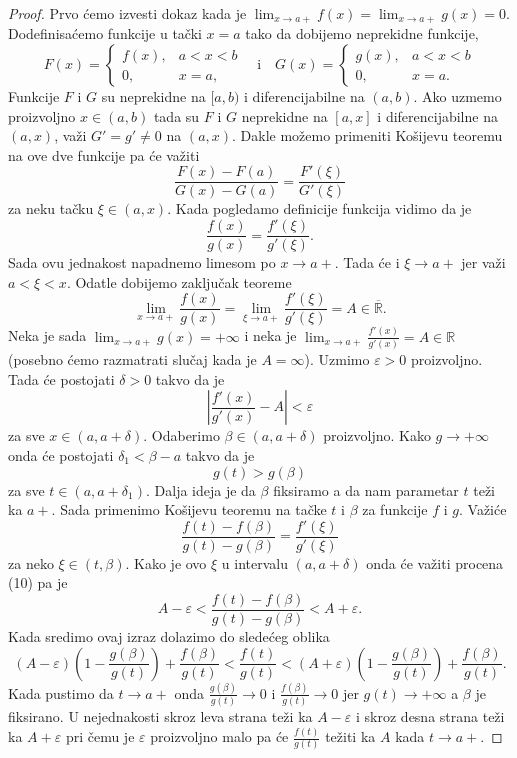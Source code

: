 \documentclass[a4paper,12pt]{article}
\theoremstyle{plain}
\theoremstyle{definition}
\theoremstyle{remark}
\begin{document}
\begin{proof}
Prvo ćemo izvesti dokaz kada je $\lim_{x \to a+} f(x) = \lim_{x \to a+} g(x) = 0$. Dodefinisaćemo funkcije u tački $x = a$ tako da dobijemo neprekidne funkcije,
$$
F(x) = \begin{cases} f(x), & a < x < b \\ 0, & x = a, \end{cases} \quad \text{i} \quad G(x) = \begin{cases} g(x), & a < x < b \\ 0, & x = a. \end{cases}
$$
Funkcije $F$ i $G$ su neprekidne na $[a, b)$ i diferencijabilne na $(a, b)$. Ako uzmemo proizvoljno $x \in (a, b)$ tada su $F$ i $G$ neprekidne na $[a, x]$ i diferencijabilne na $(a, x)$, važi $G' = g' \neq 0$ na $(a, x)$. Dakle možemo primeniti Košijevu teoremu na ove dve funkcije pa će važiti
$$
\frac{F(x) - F(a)}{G(x) - G(a)} = \frac{F'(\xi)}{G'(\xi)}
$$
za neku tačku $\xi \in (a, x)$. Kada pogledamo definicije funkcija vidimo da je
$$
\frac{f(x)}{g(x)} = \frac{f'(\xi)}{g'(\xi)}.
$$
Sada ovu jednakost napadnemo limesom po $x \to a+$. Tada će i $\xi \to a+$ jer važi $a < \xi < x$. Odatle dobijemo zaključak teoreme
$$
\lim_{x \to a+} \frac{f(x)}{g(x)} = \lim_{\xi \to a+} \frac{f'(\xi)}{g'(\xi)} = A \in \overline{\mathbb{R}}.
$$
Neka je sada $\lim_{x \to a+} g(x) = +\infty$ i neka je $\lim_{x \to a+} \frac{f'(x)}{g'(x)} = A \in \mathbb{R}$ (posebno ćemo razmatrati slučaj kada je $A = \infty$). Uzmimo $\varepsilon > 0$ proizvoljno. Tada će postojati $\delta > 0$ takvo da je
\begin{equation}
\left| \frac{f'(x)}{g'(x)} - A \right| < \varepsilon
\end{equation}
za sve $x \in (a, a + \delta)$. Odaberimo $\beta \in (a, a + \delta)$ proizvoljno. Kako $g \to +\infty$ onda će postojati $\delta_1 < \beta - a$ takvo da je
$$
g(t) > g(\beta)
$$
za sve $t \in (a, a + \delta_1)$. Dalja ideja je da $\beta$ fiksiramo a da nam parametar $t$ teži ka $a+$. Sada primenimo Košijevu teoremu na tačke $t$ i $\beta$ za funkcije $f$ i $g$. Važiće
$$
\frac{f(t) - f(\beta)}{g(t) - g(\beta)} = \frac{f'(\xi)}{g'(\xi)}
$$
za neko $\xi \in (t, \beta)$. Kako je ovo $\xi$ u intervalu $(a, a + \delta)$ onda će važiti procena (10) pa je
$$
A - \varepsilon < \frac{f(t) - f(\beta)}{g(t) - g(\beta)} < A + \varepsilon.
$$
Kada sredimo ovaj izraz dolazimo do sledećeg oblika
$$
(A - \varepsilon) \left(1 - \frac{g(\beta)}{g(t)}\right) + \frac{f(\beta)}{g(t)} < \frac{f(t)}{g(t)} < (A + \varepsilon) \left(1 - \frac{g(\beta)}{g(t)}\right) + \frac{f(\beta)}{g(t)}.
$$
Kada pustimo da $t \to a+$ onda $\frac{g(\beta)}{g(t)} \to 0$ i $\frac{f(\beta)}{g(t)} \to 0$ jer $g(t) \to +\infty$ a $\beta$ je fiksirano. U nejednakosti skroz leva strana teži ka $A - \varepsilon$ i skroz desna strana teži ka $A + \varepsilon$ pri čemu je $\varepsilon$ proizvoljno malo pa će $\frac{f(t)}{g(t)}$ težiti ka $A$ kada $t \to a+$.


\end{proof}
\end{document}
